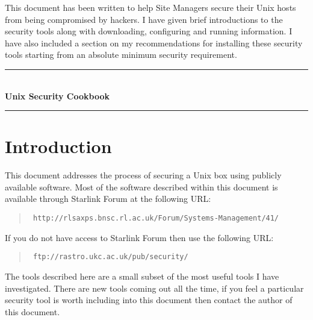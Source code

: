 \documentclass[11pt]{article}
\newcommand{\stardocinitials}  {SSN}
\newcommand{\stardocnumber}    {67.1}
\newcommand{\stardoctitle}     {Unix Security Cookbook}
\newcommand{\stardocabstract}  {

This document has been written to help Site Managers secure their
Unix hosts from being compromised by hackers. I have given brief
introductions to the security tools along with downloading, configuring
and running information. I have also included a section on my
recommendations for installing these security tools starting from an
absolute minimum security requirement.
}
\newcommand{\stardocname}{\stardocinitials /\stardocnumber}
\newcommand{\htmladdnormallink}[2]{#1}
\newenvironment{latexonly}{}{}
\newcommand{\xlabel}[1]{}
\renewcommand{\thepage}{\roman{page}}
\begin{document}
\stardocabstract
\newpage
\begin{latexonly}
  \begin {center}
    \rule{80mm}{0.5mm} \\ [1ex]
    \vspace{5mm}
     {\Large\bf \stardoctitle} \\ [2.5ex]
    \rule{80mm}{0.5mm}
  \end{center}
  \vspace{30mm}
  \setlength{\parskip}{0mm}
  \tableofcontents
  \setlength{\parskip}{\medskipamount}
  \markright{\stardocname}
\end{latexonly}
\newpage
\renewcommand{\thepage}{\arabic{page}}
\setcounter{page}{1}

\section{\label{introduction}\xlabel{introduction}Introduction}

This document addresses the process of securing a Unix
box using publicly available software. Most of the software described within
this document is available through Starlink Forum at the following URL:

\begin{quote}{\tt
\htmladdnormallink{http://rlsaxps.bnsc.rl.ac.uk/Forum/Systems-Management/41/}
{http://rlsaxps.bnsc.rl.ac.uk/Forum/Systems-Management/41/}}
\end{quote}

If you do not have access to Starlink Forum then use the following URL:

\begin{quote}{\tt
\htmladdnormallink{ftp://rastro.ukc.ac.uk/pub/security/}
{ftp://rastro.ukc.ac.uk/pub/security/}}
\end{quote}

The tools described here are a small subset of the most useful tools
I have investigated. There are new tools coming out all the time, if
you feel a particular security tool is worth including into this
document then contact the author of this document.
\end{document}
